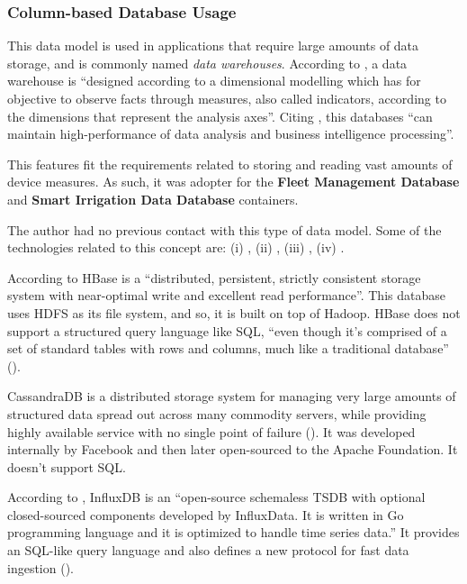 \subsubsection*{Column-based Database Usage}
\label{subsubsec:implementation:decisions:database:time}

This data model is used in applications that require large amounts of data storage, and is commonly named \textit{data warehouses}. According to \cite{dehdouh2015using}, a data warehouse  is ``designed according to a dimensional modelling which has for objective to observe facts through measures, also called indicators, according to the dimensions that represent the analysis axes''. Citing \cite{han2011survey}, this databases ``can maintain high-performance of data analysis and business intelligence processing''.

This features fit the requirements related to storing and reading vast amounts of device measures. As such, it was adopter for the \textbf{Fleet Management Database} and \textbf{Smart Irrigation Data Database} containers.

The author had no previous contact with this type of data model. Some of the technologies related to this concept are: (i) , (ii) , (iii) , (iv) .

According to \cite{george2011hbase} HBase is a ``distributed, persistent, strictly consistent storage system with near-optimal write and excellent read performance''. This database uses \gls{HDFS} as its file system, and so, it is built on top of Hadoop. 
HBase does not support a structured query language like \gls{SQL}, ``even though it's comprised of a set of standard tables with rows and columns, much like a traditional database'' (\cite{ibm-hbase}).

CassandraDB is a distributed storage system for managing very large amounts of structured data spread out across many commodity servers, while providing highly available service with no single point of failure (\cite{lakshman2010cassandra}).
It was developed internally by Facebook and then later open-sourced to the Apache Foundation. It doesn't support \gls{SQL}.

According to \cite{naqvi2017time}, InfluxDB is an ``open-source schemaless \gls{TSDB} with optional closed-sourced components developed by InfluxData. It is written in Go programming language and it is optimized to handle time series data.'' It provides an SQL-like query language and also defines a new protocol for fast data ingestion (\cite{ilp}).

